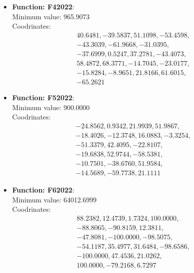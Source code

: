 \documentclass{article}
\begin{document}
\begin{itemize}
  \item \textbf{Function: F42022}: \\
    Minimum value: 965.9073 \\
    Coodrinates:
    \[
      \begin{aligned}
        & 40.6481, -39.5837, 51.1098, -53.4598, \\
        & -43.3039, -61.9668, -31.0395, \\
        & -37.6999, 0.5247, 37.2781, -43.4073, \\
        & 58.4872, 68.3771, -14.7045, -23.0177, \\
        & -15.8284, -8.9651, 21.8166, 61.6015, \\
        & -65.2621
      \end{aligned}
    \]

  \item \textbf{Function: F52022}: \\
    Minimum value: 900.0000 \\
    Coodrinates:
    \[
      \begin{aligned}
        & -24.8562, 0.9342, 21.9939, 51.9867, \\
        & -18.4026, -12.3748, 16.0883, -3.3254, \\
        & -51.3379, 42.4095, -22.8107, \\
        & -19.6838, 52.9744, -58.5381, \\
        & -10.7501, -38.6760, 51.9584, \\
        & -14.5689, -59.7738, 21.1111
      \end{aligned}
    \]

  \item \textbf{Function: F62022}: \\
    Minimum value: 64012.6999 \\
    Coodrinates:
    \[
      \begin{aligned}
        & 88.2382, 12.4739, 1.7324, 100.0000, \\
        & -88.8065, -90.8159, 12.3811, \\
        & -47.8081, -100.0000, -98.5075, \\
        & -54.1187, 35.4977, 31.6484, -98.6586, \\
        & -100.0000, 47.4536, 21.0262, \\
        & 100.0000, -79.2168, 6.7297
      \end{aligned}
    \]


\end{itemize}
\end{document}
